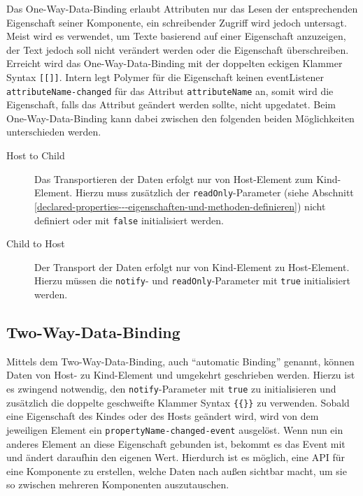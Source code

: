 Das One-Way-Data-Binding erlaubt Attributen nur das Lesen der entsprechenden Eigenschaft seiner Komponente, ein schreibender Zugriff wird jedoch untersagt. Meist wird es verwendet, um Texte basierend auf einer Eigenschaft anzuzeigen, der Text jedoch soll nicht verändert werden oder die Eigenschaft überschreiben. Erreicht wird das One-Way-Data-Binding mit der doppelten eckigen Klammer Syntax \texttt{{[}{[}{]}{]}}. Intern legt Polymer für die Eigenschaft keinen eventListener \texttt{attributeName-changed} für das Attribut \texttt{attributeName} an, somit wird die Eigenschaft, falls das Attribut geändert werden sollte, nicht upgedatet. Beim One-Way-Data-Binding kann dabei zwischen den folgenden beiden Möglichkeiten unterschieden werden.

\begin{description}
  \item[Host to Child] Das Transportieren der Daten erfolgt nur von Host-Element zum Kind-Element. Hierzu muss zusätzlich der \texttt{readOnly}-Parameter (siehe Abschnitt \ref{declared-properties---eigenschaften-und-methoden-definieren}) nicht definiert oder mit \texttt{false} initialisiert werden.
  \item[Child to Host] Der Transport der Daten erfolgt nur von Kind-Element zu Host-Element. Hierzu müssen die \texttt{notify}- und \texttt{readOnly}-Parameter mit \texttt{true} initialisiert werden.
\end{description}


\subsection{Two-Way-Data-Binding}\label{two-way-data-binding}

Mittels dem Two-Way-Data-Binding, auch ``automatic Binding'' genannt, können Daten von Host- zu Kind-Element und umgekehrt geschrieben werden. Hierzu ist es zwingend notwendig, den \texttt{notify}-Parameter mit \texttt{true} zu initialisieren und zusätzlich die doppelte geschweifte Klammer Syntax \texttt{\{\{\}\}} zu verwenden. Sobald eine Eigenschaft des Kindes oder des Hosts geändert wird, wird von dem jeweiligen Element ein \texttt{propertyName-changed-event} ausgelöst. Wenn nun ein anderes Element an diese Eigenschaft gebunden ist, bekommt es das Event mit und ändert daraufhin den eigenen Wert. Hierdurch ist es möglich, eine \ac{API} für eine Komponente zu erstellen, welche Daten nach außen sichtbar macht, um sie so zwischen mehreren Komponenten auszutauschen.


